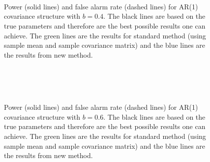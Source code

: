 \begin{figure}[htp]
\centering

\\
\\
\\
\caption{Power (solid lines) and false alarm rate (dashed lines) for AR(1) covariance structure with $b=0.4$. The black lines are based on the true parameters and therefore are the best possible results one can achieve. The green lines are the results for standard method (using sample mean and sample covariance matrix) and the blue lines are the results from new method. \label{sup.2}}        
\end{figure}


\begin{figure}[htp]
\centering
{}
\\
\\
\\
\caption{Power (solid lines) and false alarm rate (dashed lines) for AR(1) covariance structure with $b=0.6$. The black lines are based on the true parameters and therefore are the best possible results one can achieve. The green lines are the results for standard method (using sample mean and sample covariance matrix) and the blue lines are the results from new method.\label{sup.3}}
\end{figure}

